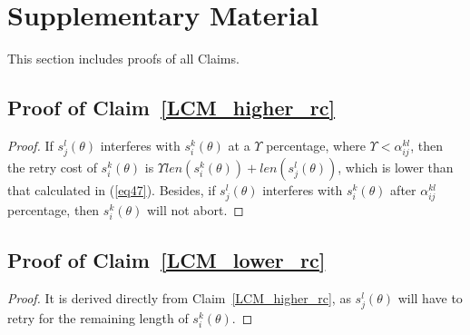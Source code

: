 \documentclass{sig-alternate}
\begin{document}

\small{}
\normalsize

\renewcommand{\thesubsection}{S.\arabic{subsection}}

\section*{Supplementary Material}

This section includes proofs of all Claims.
\subsection{\label{proof_LCM_higher_rc}Proof of Claim~\ref{LCM_higher_rc}}
\begin{proof}
If $s_{j}^{l}(\theta)$ interferes with $s_{i}^{k}(\theta)$
at a $\Upsilon$ percentage, where $\Upsilon<\alpha_{ij}^{kl}$,
then the retry cost of $s_{i}^{k}(\theta)$ is $\Upsilon len(s_{i}^{k}(\theta))+len(s_{j}^{l}(\theta))$, which is lower than that calculated in (\ref{eq47}). Besides, 
if $s_{j}^{l}(\theta)$ interferes with $s_{i}^{k}(\theta)$ after
$\alpha_{ij}^{kl}$ percentage, then $s_{i}^{k}(\theta)$ will not
abort.
\end{proof}
\subsection{\label{proof_LCM_lower_rc} Proof of Claim~\ref{LCM_lower_rc}}
\begin{proof}
It is derived directly from Claim~\ref{LCM_higher_rc}, as $s_j^l(\theta)$ will have to retry for the remaining length of $s_i^k(\theta)$.
\end{proof}
\end{document}
